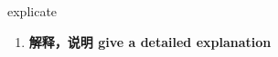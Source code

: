 
\begin{frame}
{\huge explicate}
\begin{center}
\begin{enumerate}\Large
  \item \textbf{解释，说明 give a detailed explanation}
\end{enumerate}
\end{center}
\end{frame}
